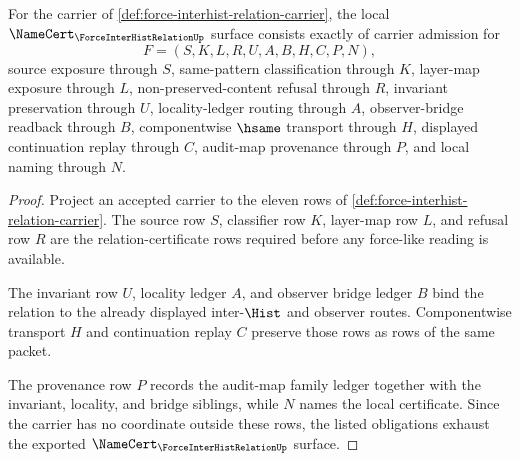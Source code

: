 \begin{theorem}
\label{thm:force-interhist-relation-namecert-obligations}
For the carrier of \autoref{def:force-interhist-relation-carrier}, the local $\NameCert_{\ForceInterHistRelationUp}$ surface consists exactly of carrier admission for
$$
F=(S,K,L,R,U,A,B,H,C,P,N),
$$
source exposure through $S$, same-pattern classification through $K$, layer-map exposure through $L$, non-preserved-content refusal through $R$, invariant preservation through $U$, locality-ledger routing through $A$, observer-bridge readback through $B$, componentwise $\hsame$ transport through $H$, displayed continuation replay through $C$, audit-map provenance through $P$, and local naming through $N$.
\end{theorem}
\begin{proof}
Project an accepted carrier to the eleven rows of \autoref{def:force-interhist-relation-carrier}. The source row $S$, classifier row $K$, layer-map row $L$, and refusal row $R$ are the relation-certificate rows required before any force-like reading is available.

The invariant row $U$, locality ledger $A$, and observer bridge ledger $B$ bind the relation to the already displayed inter-$\Hist$ and observer routes. Componentwise transport $H$ and continuation replay $C$ preserve those rows as rows of the same packet.

The provenance row $P$ records the audit-map family ledger together with the invariant, locality, and bridge siblings, while $N$ names the local certificate. Since the carrier has no coordinate outside these rows, the listed obligations exhaust the exported $\NameCert_{\ForceInterHistRelationUp}$ surface.
\end{proof}

